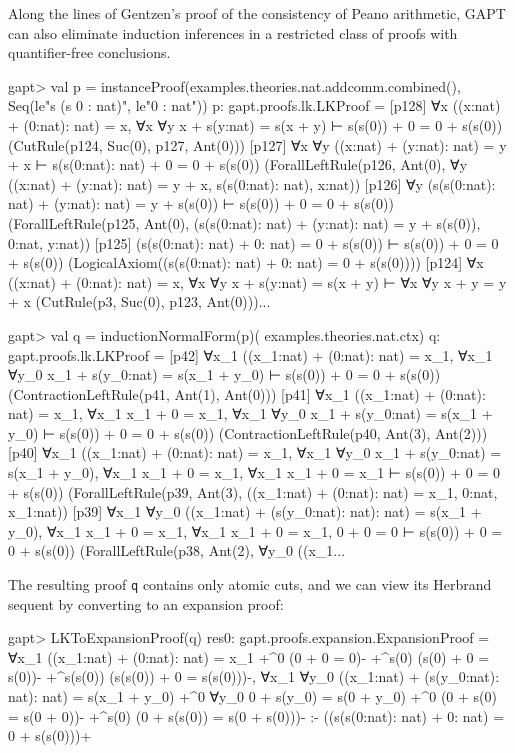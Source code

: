 \documentclass[a4paper,11pt]{book}
\begin{document}
Along the lines of Gentzen's proof of the consistency of Peano arithmetic,
GAPT can also eliminate induction inferences in a restricted class of proofs
with quantifier-free conclusions.

\begin{clilisting}
gapt> val p = instanceProof(examples.theories.nat.addcomm.combined(),                                     Seq(le"s (s 0 : nat)", le"0 : nat"))
p: gapt.proofs.lk.LKProof =
[p128] ∀x ((x:nat) + (0:nat): nat) = x,
∀x ∀y x + s(y:nat) = s(x + y)
⊢
s(s(0)) + 0 = 0 + s(s(0))    (CutRule(p124, Suc(0), p127, Ant(0)))
[p127] ∀x ∀y ((x:nat) + (y:nat): nat) = y + x ⊢ s(s(0:nat): nat) + 0 = 0 + s(s(0))    (ForallLeftRule(p126, Ant(0), ∀y ((x:nat) + (y:nat): nat) = y + x, s(s(0:nat): nat), x:nat))
[p126] ∀y (s(s(0:nat): nat) + (y:nat): nat) = y + s(s(0)) ⊢ s(s(0)) + 0 = 0 + s(s(0))    (ForallLeftRule(p125, Ant(0), (s(s(0:nat): nat) + (y:nat): nat) = y + s(s(0)), 0:nat, y:nat))
[p125] (s(s(0:nat): nat) + 0: nat) = 0 + s(s(0)) ⊢ s(s(0)) + 0 = 0 + s(s(0))    (LogicalAxiom((s(s(0:nat): nat) + 0: nat) = 0 + s(s(0))))
[p124] ∀x ((x:nat) + (0:nat): nat) = x,
∀x ∀y x + s(y:nat) = s(x + y)
⊢
∀x ∀y x + y = y + x    (CutRule(p3, Suc(0), p123, Ant(0)))...

gapt> val q = inductionNormalForm(p)(                                         examples.theories.nat.ctx)
q: gapt.proofs.lk.LKProof =
[p42] ∀x_1 ((x_1:nat) + (0:nat): nat) = x_1,
∀x_1 ∀y_0 x_1 + s(y_0:nat) = s(x_1 + y_0)
⊢
s(s(0)) + 0 = 0 + s(s(0))    (ContractionLeftRule(p41, Ant(1), Ant(0)))
[p41] ∀x_1 ((x_1:nat) + (0:nat): nat) = x_1,
∀x_1 x_1 + 0 = x_1,
∀x_1 ∀y_0 x_1 + s(y_0:nat) = s(x_1 + y_0)
⊢
s(s(0)) + 0 = 0 + s(s(0))    (ContractionLeftRule(p40, Ant(3), Ant(2)))
[p40] ∀x_1 ((x_1:nat) + (0:nat): nat) = x_1,
∀x_1 ∀y_0 x_1 + s(y_0:nat) = s(x_1 + y_0),
∀x_1 x_1 + 0 = x_1,
∀x_1 x_1 + 0 = x_1
⊢
s(s(0)) + 0 = 0 + s(s(0))    (ForallLeftRule(p39, Ant(3), ((x_1:nat) + (0:nat): nat) = x_1, 0:nat, x_1:nat))
[p39] ∀x_1 ∀y_0 ((x_1:nat) + (s(y_0:nat): nat): nat) = s(x_1 + y_0),
∀x_1 x_1 + 0 = x_1,
∀x_1 x_1 + 0 = x_1,
0 + 0 = 0
⊢
s(s(0)) + 0 = 0 + s(s(0))    (ForallLeftRule(p38, Ant(2), ∀y_0 ((x_1...

\end{clilisting}

The resulting proof \texttt{q} contains only atomic cuts, and we can view its Herbrand
sequent by converting to an expansion proof:

\begin{clilisting}
gapt> LKToExpansionProof(q)
res0: gapt.proofs.expansion.ExpansionProof =
∀x_1 ((x_1:nat) + (0:nat): nat) = x_1
  +^{0} (0 + 0 = 0)-
  +^{s(0)} (s(0) + 0 = s(0))-
  +^{s(s(0))} (s(s(0)) + 0 = s(s(0)))-,
∀x_1 ∀y_0 ((x_1:nat) + (s(y_0:nat): nat): nat) = s(x_1 + y_0)
  +^{0}
    ∀y_0 0 + s(y_0) = s(0 + y_0)
    +^{0} (0 + s(0) = s(0 + 0))-
    +^{s(0)} (0 + s(s(0)) = s(0 + s(0)))-
:-
((s(s(0:nat): nat) + 0: nat) = 0 + s(s(0)))+

\end{clilisting}
\end{document}
